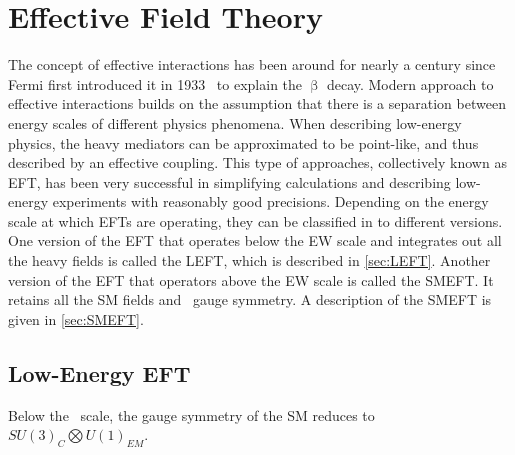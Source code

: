 \chapter{Effective Field Theory}
\label{chap:EFT}

The concept of effective interactions has been around for nearly a century since Fermi first introduced it in 1933~\cite{Fermi:1933jpa} to explain the $\upbeta$ decay. Modern approach to effective interactions builds on the assumption that there is a separation between energy scales of different physics phenomena. When describing low-energy physics, the heavy mediators can be approximated to be point-like, and thus described by an effective coupling. This type of approaches, collectively known as \ac{EFT}, has been very successful in simplifying calculations and describing low-energy experiments with reasonably good precisions. Depending on the energy scale at which \acp{EFT} are operating, they can be classified in to different versions. One version of the \ac{EFT} that operates below the \ac{EW} scale and integrates out all the heavy fields is called the \ac{LEFT}, which is described in \autoref{sec:LEFT}. Another version of the \ac{EFT} that operators above the \ac{EW} scale is called the \ac{SMEFT}. It retains all the \ac{SM} fields and \sm~gauge symmetry. A description of the \ac{SMEFT} is given in \autoref{sec:SMEFT}.

\section{Low-Energy EFT}
\label{sec:LEFT}

Below the \ew~scale, the gauge symmetry of the \ac{SM} reduces to $SU(3)_{C}\bigotimes U(1)_{EM}$.

